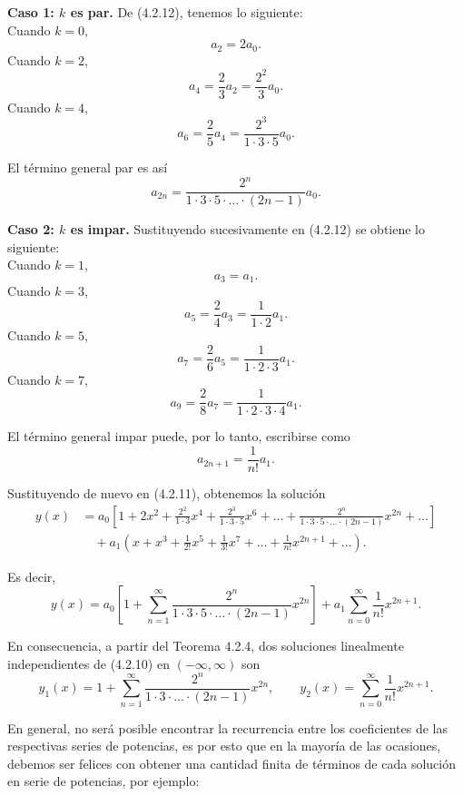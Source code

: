 \begin{example}
\vspace{0.3cm}
\noindent \textbf{Caso 1: $k$ es par.} \quad De (4.2.12), tenemos lo siguiente: \\
Cuando $k = 0$,
\[ a_2 = 2a_0. \]
Cuando $k = 2$,
\[ a_4 = \frac{2}{3}a_2 = \frac{2^2}{3}a_0. \]
Cuando $k = 4$,
\[ a_6 = \frac{2}{5}a_4 = \frac{2^3}{1 \cdot 3 \cdot 5}a_0. \]

El término general par es así
\[ a_{2n} = \frac{2^n}{1 \cdot 3 \cdot 5 \cdot \dots \cdot (2n - 1)}a_0. \]

\vspace{0.3cm}
\noindent \textbf{Caso 2: $k$ es impar.} \quad Sustituyendo sucesivamente en (4.2.12) se obtiene lo siguiente: \\
Cuando $k = 1$,
\[ a_3 = a_1. \]
Cuando $k = 3$,
\[ a_5 = \frac{2}{4}a_3 = \frac{1}{1 \cdot 2}a_1. \]
Cuando $k = 5$,
\[ a_7 = \frac{2}{6}a_5 = \frac{1}{1 \cdot 2 \cdot 3}a_1. \]
Cuando $k = 7$,
\[ a_9 = \frac{2}{8}a_7 = \frac{1}{1 \cdot 2 \cdot 3 \cdot 4}a_1. \]

El término general impar puede, por lo tanto, escribirse como
\[ a_{2n+1} = \frac{1}{n!}a_1. \]

Sustituyendo de nuevo en (4.2.11), obtenemos la solución
\begin{align*}
y(x) &= a_0 \left[ 1 + 2x^2 + \frac{2^2}{1 \cdot 3}x^4 + \frac{2^3}{1 \cdot 3 \cdot 5}x^6 + \dots + \frac{2^n}{1 \cdot 3 \cdot 5 \cdot \dots \cdot (2n-1)}x^{2n} + \dots \right] \\
&\quad + a_1 \left( x + x^3 + \frac{1}{2!}x^5 + \frac{1}{3!}x^7 + \dots + \frac{1}{n!}x^{2n+1} + \dots \right).
\end{align*}

Es decir,
\[ y(x) = a_0 \left[ 1 + \sum_{n=1}^{\infty} \frac{2^n}{1 \cdot 3 \cdot 5 \cdot \dots \cdot (2n-1)}x^{2n} \right] + a_1 \sum_{n=0}^{\infty} \frac{1}{n!}x^{2n+1}. \]

En consecuencia, a partir del Teorema 4.2.4, dos soluciones linealmente independientes de (4.2.10) en $(-\infty, \infty)$ son
\[ y_1(x) = 1 + \sum_{n=1}^{\infty} \frac{2^n}{1 \cdot 3 \cdot \dots \cdot (2n-1)}x^{2n}, \qquad y_2(x) = \sum_{n=0}^{\infty} \frac{1}{n!}x^{2n+1}. \tag*{$\square$} \]

\end{example}

En general, no será posible encontrar la recurrencia entre los coeficientes de las respectivas series de potencias, es por esto que en la mayor\'ia de las ocasiones, debemos ser felices con obtener una cantidad finita de términos de cada solución en serie de potencias, por ejemplo:

